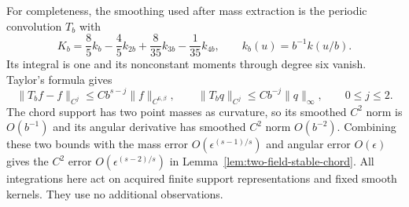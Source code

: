 For completeness, the smoothing used after mass extraction is the
periodic convolution $T_b$ with
\[
 K_b=\frac85 k_b-\frac45 k_{2b}
                  +\frac8{35}k_{3b}-\frac1{35}k_{4b},
                 \qquad k_b(u)=b^{-1}k(u/b).
\]
Its integral is one and its nonconstant moments through degree six
vanish.  Taylor's formula gives
\[
 \|T_bf-f\|_{C^j}\le Cb^{s-j}\|f\|_{C^{6,\beta}},
   \qquad
 \|T_bq\|_{C^j}\le Cb^{-j}\|q\|_\infty,
                 \qquad 0\le j\le2.
\]
The chord support has two point masses as curvature, so its smoothed
$C^2$ norm is $O(b^{-1})$ and its angular derivative has smoothed
$C^2$ norm $O(b^{-2})$.  Combining these two bounds with the
mass error $O(\epsilon^{(s-1)/s})$ and angular error
$O(\epsilon)$ gives the $C^2$ error
$O(\epsilon^{(s-2)/s})$ in
Lemma~\ref{lem:two-field-stable-chord}.
All integrations here act on acquired finite support representations
and fixed smooth kernels.  They use no additional observations.
